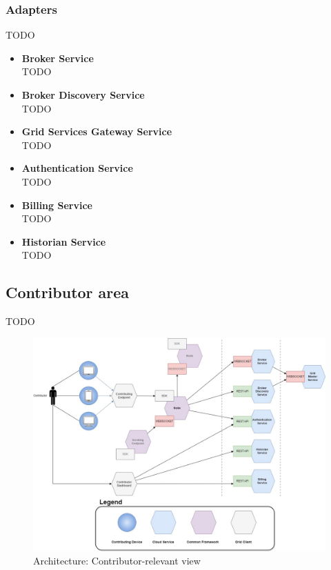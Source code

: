 \subsubsection{Adapters}
TODO
\begin{itemize}
    \item \textbf{Broker Service}\\
    TODO
    \item \textbf{Broker Discovery Service}\\
    TODO
    \item \textbf{Grid Services Gateway Service}\\
    TODO
    \item \textbf{Authentication Service}\\
    TODO
    \item \textbf{Billing Service}\\
    TODO
    \item \textbf{Historian Service}\\
    TODO
\end{itemize}
\subsection{Contributor area}\label{contributor_area}
TODO

\begin{figure}[!ht]
    \centering
    \includegraphics[width=\linewidth]{document/chapters/chapter_6/images/architecture_contributor.jpg}
    \caption{Architecture: Contributor-relevant view}
    \label{fig:architecture_contributor}
\end{figure}

